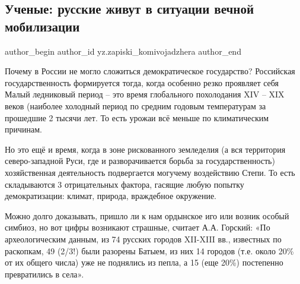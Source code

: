  
 
 
 
 
 
\subsection{Ученые: русские живут в ситуации вечной мобилизации}
\label{sec:05_01_2022.yz.zapiski_komivojadzhera.1.russkie_vechnaja_mobilizacia}
 
\ifcmt
 author_begin
   author_id yz.zapiski_komivojadzhera
 author_end
\fi

Почему в России не могло сложиться демократическое государство? Российская
государственность формируется тогда, когда особенно резко проявляет себя Малый
ледниковый период – это время глобального похолодания XIV – XIX веков (наиболее
холодный период по средним годовым температурам за прошедшие 2 тысячи лет. То
есть урожаи всё меньше по климатическим причинам.


Но это ещё и время, когда в зоне рискованного земледелия (а вся территория
северо-западной Руси, где и разворачивается борьба за государственность)
хозяйственная деятельность подвергается могучему воздействию Степи. То есть
складываются 3 отрицательных фактора, гасящие любую попытку демократизации:
климат, природа, враждебное окружение.

Можно долго доказывать, пришло ли к нам ордынское иго или возник особый
симбиоз, но вот цифры возникают страшные, считает А.А. Горский: «По
археологическим данным, из 74 русских городов XII-XIII вв., известных по
раскопкам, 49 (2/3!) были разорены Батыем, из них 14 городов (т.е. около 20\% от
их общего числа) уже не поднялись из пепла, а 15 (еще 20\%) постепенно
превратились в села».

